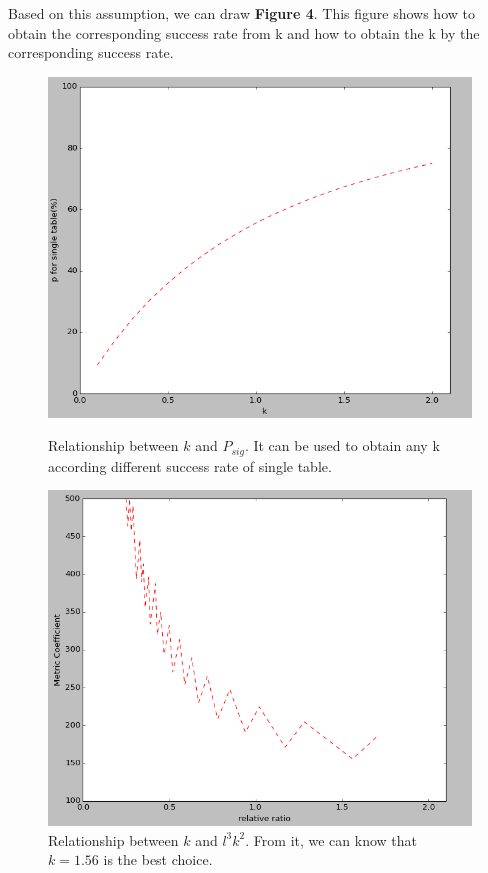 \documentclass[runningheads,a4paper]{llncs}
\begin{document}
Based on this assumption, we can draw \textbf{Figure 4}. This figure shows how to obtain the corresponding success rate from k and  how to obtain the k by the corresponding success rate.

\begin{figure}[!htb]
  \includegraphics[width=\linewidth]{graph4}
  \caption{Relationship between $k$ and $P_{sig}$. It can be used to obtain any k according different success rate of single table.}
\endminipage\hfill
{}
  \includegraphics[width=\linewidth]{graph5}
  \caption{Relationship between $k$ and $l^3 k^2$. From it, we can know that $k = 1.56$ is the best choice.}
\endminipage\hfill
\end{figure}
\end{document}
